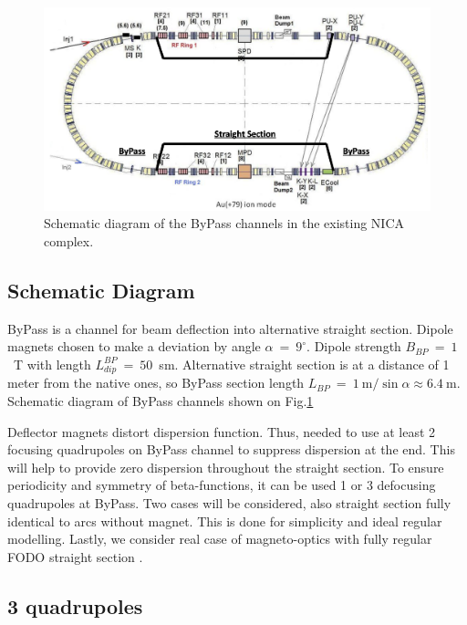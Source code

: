 \documentclass[a4paper]{jpconf}
\begin{document}
\begin{figure}[!h]
   \centering
   \includegraphics*[width=1.\columnwidth]{fig1}
   \caption{Schematic diagram of the ByPass channels in the existing NICA complex.}
   \label{fig:schematic}
\end{figure}

\subsection{Schematic Diagram}

\par ByPass is a channel for beam deflection into alternative straight section. Dipole magnets chosen to make a deviation by angle $\alpha~=~9^\circ$. Dipole strength $B_{BP}~=~1$~T with length $L^{BP}_{dip}~=~50$~sm. Alternative straight section is at a distance of 1 meter from the native ones, so ByPass section length $L_{BP}~=~1~\text{m}/\sin{\alpha}\approx6.4~\text{m}$. Schematic diagram of ByPass channels shown on Fig.\ref{fig:schematic}

\par Deflector magnets distort dispersion function. 
Thus, needed to use at least 2 focusing quadrupoles on ByPass channel to suppress dispersion at the end. This will help to provide zero dispersion throughout the straight section.
To ensure periodicity and symmetry of beta-functions, it can be used 1 or 3 defocusing quadrupoles at ByPass. 
Two cases will be considered, also straight section fully identical to arcs without magnet.
This is done for simplicity and ideal regular modelling.
Lastly, we consider real case of magneto-optics with fully regular FODO straight section .

\subsection{3 quadrupoles}
\end{document}
